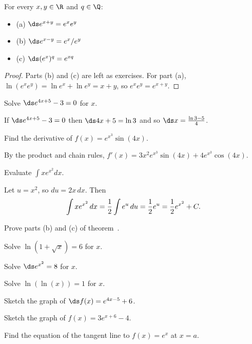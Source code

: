 \begin{theorem}
\begin{theorem} For every $x,y \in \R$ and
$q\in\Q$:
\label{thm:exp rules}
\begin{itemize} %

\item{(a)} $\ds e^{x+y} = e^x e^y $

\item{(b)} $\ds e^{x-y} = e^x/e^y$

\item{(c)} $\ds (e^x )^q = e^{xq} $

\end{itemize}

\begin{proof} Parts (b) and (c) are left as exercises. For part
(a),
$\ln (e^x e^y) =\ln e^x + \ln e^y = x +y$, so
$e^x e^y = e^{x+y }$.
\end{proof}

\begin{example} Solve $\ds e^{4x+5} - 3 =0$
for $x$.

If  $\ds e^{4x+5} - 3 =0$ then $\ds 4x+5 =\ln 3$ and
so $\ds x={\ln 3 -5\over 4}$.
\end{example}

\begin{example} Find the derivative of $f(x) =e^{x^3 } \sin (4x)$.

By the product and chain rules,
$f'(x) =3x^2 e^{x^3 } \sin (4x) + 4 e^{x^3 } \cos(4x)$.
\end{example}

\begin{example} Evaluate $\int x e^{x^2 } dx $.

Let $u=x^2$, so $du = 2x\,dx$. Then
$$\int x e^{x^2}\,dx={1\over2}\int e^u\,du= {1\over2}e^u=
{1\over2}e^{x^2}+C.$$
\vskip-20pt
\end{example}

\begin{exercises}

\exer Prove parts (b) and (c) of theorem~.


\exer Solve $\ln (1+ \sqrt{x} ) = 6 $ for  $x$.


\exer Solve $\ds e^{x^2} = 8$ for $x$.


\exer Solve $\ln (\ln (x) ) = 1 $ for $x$.

\exer Sketch the graph of $\ds f(x) = e^{4x-5 }+ 6 $.

\exer Sketch the graph of $f(x) =3e^{x+6} -4 $.

\exer Find the equation of the tangent line to $f(x) =e^x $
at $x= a $.


\end{exercises}
\end{theorem}
\end{theorem}

